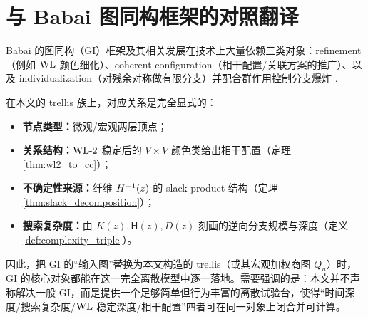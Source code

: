 
\section{与 Babai 图同构框架的对照翻译}

Babai 的图同构（GI）框架及其相关发展在技术上大量依赖三类对象：refinement（例如 $\mathrm{WL}$ 颜色细化）、coherent configuration（相干配置/关联方案的推广）、以及 individualization（对残余对称做有限分支）并配合群作用控制分支爆炸 \cite{babai2016gi,luks1982isomorphism,ivanov2013coherent,cameron1999permutation}.

在本文的 trellis 族上，对应关系是完全显式的：
\begin{itemize}
  \item \textbf{节点类型：}微观/宏观两层顶点；
  \item \textbf{关系结构：}$\mathrm{WL}\text{-}2$ 稳定后的 $V\times V$ 颜色类给出相干配置（定理 \ref{thm:wl2_to_cc}）；
  \item \textbf{不确定性来源：}纤维 $H^{-1}(z)$ 的 slack-product 结构（定理 \ref{thm:slack_decomposition}）；
  \item \textbf{搜索复杂度：}由 $K(z),\mathsf{H}(z),D(z)$ 刻画的逆向分支规模与深度（定义 \ref{def:complexity_triple}）。
\end{itemize}

因此，把 GI 的“输入图”替换为本文构造的 trellis（或其宏观加权商图 $Q_n$）时，GI 的核心对象都能在这一完全离散模型中逐一落地。需要强调的是：本文并不声称解决一般 GI，而是提供一个足够简单但行为丰富的离散试验台，使得“时间深度/搜索复杂度/$\mathrm{WL}$ 稳定深度/相干配置”四者可在同一对象上闭合并可计算。


